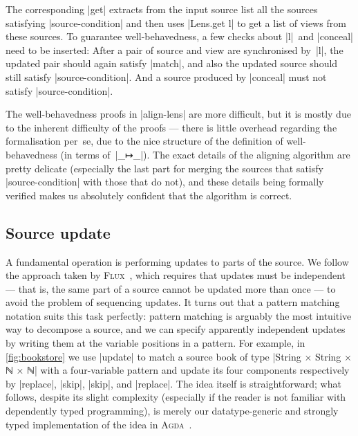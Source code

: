 \documentclass[fleqn]{llncs}
\newcommand{\Agda}{\textsc{Agda}}
\begin{document}
The corresponding |get| extracts from the input source list all the sources satisfying |source-condition| and then uses |Lens.get l| to get a list of views from these sources.
To guarantee well-behavedness, a few checks about |l|~and |conceal| need to be inserted:
After a pair of source and view are synchronised by~|l|, the updated pair should again satisfy |match|, and also the updated source should still satisfy |source-condition|.
And a source produced by |conceal| must not satisfy |source-condition|.

The well-behavedness proofs in |align-lens| are more difficult, but it is mostly due to the inherent difficulty of the proofs --- there is little overhead regarding the formalisation per~se, due to the nice structure of the definition of well-behavedness (in terms of~|_↦_|).
The exact details of the aligning algorithm are pretty delicate (especially the last part for merging the sources that satisfy |source-condition| with those that do not), and these details being formally verified makes us absolutely confident that the algorithm is correct.

\subsection{Source update}
\label{sec:source-update}

A fundamental operation is performing updates to parts of the source.
We follow the approach taken by \textsc{Flux}~\cite{Cheney-FLUX}, which requires that updates must be independent --- that is, the same part of a source cannot be updated more than once --- to avoid the problem of sequencing updates.
It turns out that a pattern matching notation suits this task perfectly: pattern matching is arguably the most intuitive way to decompose a source, and we can specify apparently independent updates by writing them at the variable positions in a pattern.
For example, in \autoref{fig:bookstore} we use |update| to match a source book of type |String × String × ℕ × ℕ| with a four-variable pattern and update its four components respectively by |replace|, |skip|, |skip|, and |replace|.
The idea itself is straightforward; what follows, despite its slight complexity (especially if the reader is not familiar with dependently typed programming), is merely our datatype-generic and strongly typed implementation of the idea in \Agda~\cite{Gibbons-DGP,Altenkirch-GP-within-DTP}.
\end{document}

